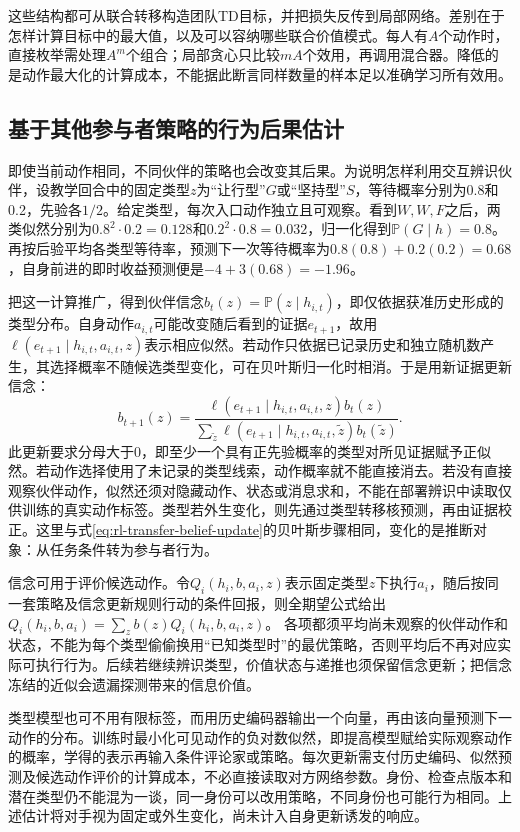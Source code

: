 这些结构都可从联合转移构造团队TD目标，并把损失反传到局部网络。差别在于怎样计算目标中的最大值，以及可以容纳哪些联合价值模式。每人有$A$个动作时，直接枚举需处理$A^m$个组合；局部贪心只比较$mA$个效用，再调用混合器。降低的是动作最大化的计算成本，不能据此断言同样数量的样本足以准确学习所有效用。

\subsection{基于其他参与者策略的行为后果估计}
\label{sec:rl-multi-agent-opponent-model}

即使当前动作相同，不同伙伴的策略也会改变其后果。为说明怎样利用交互辨识伙伴，设教学回合中的固定类型$z$为“让行型”$G$或“坚持型”$S$，等待概率分别为0.8和0.2，先验各$1/2$。给定类型，每次入口动作独立且可观察。看到$W,W,F$之后，两类似然分别为$0.8^2\cdot0.2=0.128$和$0.2^2\cdot0.8=0.032$，归一化得到$\mathbb P(G\mid h)=0.8$。再按后验平均各类型等待率，预测下一次等待概率为$0.8(0.8)+0.2(0.2)=0.68$，自身前进的即时收益预测便是$-4+3(0.68)=-1.96$。

把这一计算推广，得到伙伴信念$b_t(z)=\mathbb P(z\mid h_{i,t})$，即仅依据获准历史形成的类型分布。自身动作$a_{i,t}$可能改变随后看到的证据$e_{t+1}$，故用$\ell(e_{t+1}\mid h_{i,t},a_{i,t},z)$表示相应似然。若动作只依据已记录历史和独立随机数产生，其选择概率不随候选类型变化，可在贝叶斯归一化时相消。于是用新证据更新信念：
\[
 b_{t+1}(z)=
 \frac{\ell(e_{t+1}\mid h_{i,t},a_{i,t},z)b_t(z)}
      {\sum_{\tilde z}\ell(e_{t+1}\mid h_{i,t},a_{i,t},\tilde z)b_t(\tilde z)}.
\]
此更新要求分母大于0，即至少一个具有正先验概率的类型对所见证据赋予正似然。若动作选择使用了未记录的类型线索，动作概率就不能直接消去。若没有直接观察伙伴动作，似然还须对隐藏动作、状态或消息求和，不能在部署辨识中读取仅供训练的真实动作标签。类型若外生变化，则先通过类型转移核预测，再由证据校正。这里与式\eqref{eq:rl-transfer-belief-update}的贝叶斯步骤相同，变化的是推断对象：从任务条件转为参与者行为。

信念可用于评价候选动作。令$Q_i(h_i,b,a_i,z)$表示固定类型$z$下执行$a_i$，随后按同一套策略及信念更新规则行动的条件回报，则全期望公式给出
$Q_i(h_i,b,a_i)=\sum_z b(z)Q_i(h_i,b,a_i,z)$。
各项都须平均尚未观察的伙伴动作和状态，不能为每个类型偷偷换用“已知类型时”的最优策略，否则平均后不再对应实际可执行行为。后续若继续辨识类型，价值状态与递推也须保留信念更新；把信念冻结的近似会遗漏探测带来的信息价值。

类型模型也可不用有限标签，而用历史编码器输出一个向量，再由该向量预测下一动作的分布。训练时最小化可见动作的负对数似然，即提高模型赋给实际观察动作的概率，学得的表示再输入条件评论家或策略。每次更新需支付历史编码、似然预测及候选动作评价的计算成本，不必直接读取对方网络参数。身份、检查点版本和潜在类型仍不能混为一谈，同一身份可以改用策略，不同身份也可能行为相同。上述估计将对手视为固定或外生变化，尚未计入自身更新诱发的响应。

